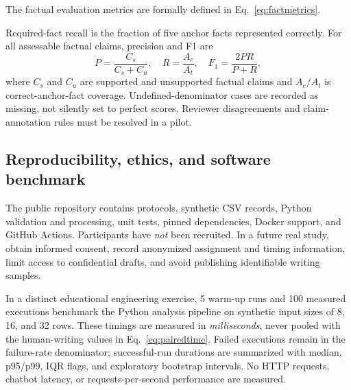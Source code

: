 The factual evaluation metrics are formally
defined in Eq.~\ref{eq:factmetrics}.


Required-fact recall is the fraction of five anchor facts represented correctly. For all assessable factual claims, precision and F1 are
\begin{equation}\label{eq:factmetrics}
  P=\frac{C_s}{C_s+C_u},\quad
  R=\frac{A_c}{A_t},\quad
  F_1=\frac{2PR}{P+R},
\end{equation}
where $C_s$ and $C_u$ are supported and unsupported factual claims and $A_c/A_t$ is correct-anchor-fact coverage. Undefined-denominator cases are recorded as missing, not silently set to perfect scores. Reviewer disagreements and claim-annotation rules must be resolved in a pilot.

\subsection{Reproducibility, ethics, and software benchmark}
The public repository contains protocols, synthetic CSV records, Python validation and processing, unit tests, pinned dependencies, Docker support, and GitHub Actions. Participants have \emph{not} been recruited. In a future real study, obtain informed consent, record anonymized assignment and timing information, limit access to confidential drafts, and avoid publishing identifiable writing samples.

In a distinct educational engineering exercise, 5 warm-up runs and 100 measured executions benchmark the Python analysis pipeline on synthetic input sizes of 8, 16, and 32 rows. These timings are measured in \emph{milliseconds}, never pooled with the human-writing values in Eq.~\eqref{eq:pairedtime}. Failed executions remain in the failure-rate denominator; successful-run durations are summarized with median, p95/p99, IQR flags, and exploratory bootstrap intervals. No HTTP requests, chatbot latency, or requests-per-second performance are measured.
